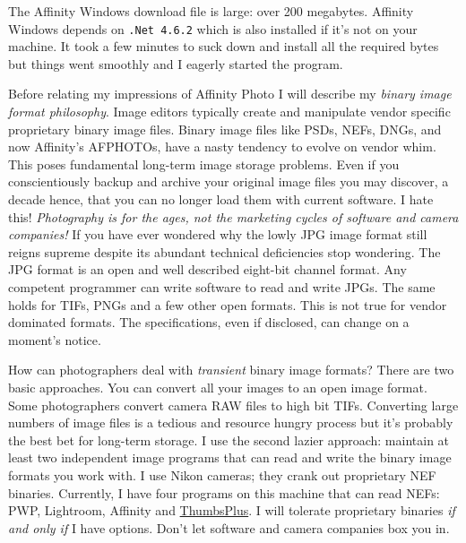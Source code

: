 The Affinity Windows download file is large: over 200 megabytes.
Affinity Windows depends on \texttt{.Net\ 4.6.2} which is also
installed if it's not on your machine. It took a few minutes to suck
down and install all the required bytes but things went smoothly and I
eagerly started the program.

Before relating my impressions of Affinity Photo I will describe my
\emph{binary image format philosophy}. Image editors typically create
and manipulate vendor specific proprietary binary image files. Binary
image files like PSDs, NEFs, DNGs, and now Affinity's AFPHOTOs, have a
nasty tendency to evolve on vendor whim. This poses fundamental
long-term image storage problems. Even if you conscientiously backup and
archive your original image files you may discover, a decade hence, that
you can no longer load them with current software. I hate this!
\emph{Photography is for the ages, not the marketing cycles of software
and camera companies!} If you have ever wondered why the lowly JPG image
format still reigns supreme despite its abundant technical deficiencies
stop wondering. The JPG format is an open and well described eight-bit
channel format. Any competent programmer can write software to read and
write JPGs. The same holds for TIFs, PNGs and a few other open formats.
This is not true for vendor dominated formats. The specifications, even
if disclosed, can change on a moment's notice.

How can photographers deal with \emph{transient} binary image formats?
There are two basic approaches. You can convert all your images to an
open image format. Some photographers convert camera RAW files to high
bit TIFs. Converting large numbers of image files is a tedious and
resource hungry process but it's probably the best bet for long-term
storage. I use the second lazier approach: maintain at least two
independent image programs that can read and write the binary image
formats you work with. I use Nikon cameras; they crank out proprietary
NEF binaries. Currently, I have four programs on this machine that can
read NEFs: PWP, Lightroom, Affinity and
\href{http://www.cerious.com/}{ThumbsPlus}. I will tolerate proprietary
binaries \emph{if and only if} I have options. Don't let software and
camera companies box you in.


